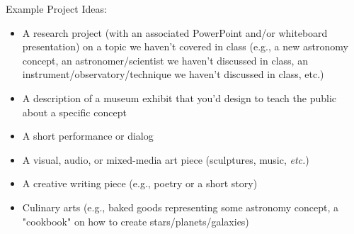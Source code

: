 \documentclass[11pt]{article}
\begin{document}
\bigskip \noindent
Example Project Ideas:
\begin{itemize}[noitemsep]
    \item A research project (with an associated PowerPoint and/or whiteboard presentation) on a topic we haven't covered in class (e.g., a new astronomy concept, an astronomer/scientist we haven’t discussed in class, an instrument/observatory/technique we haven’t discussed in class, etc.)
    \item A description of a museum exhibit that you'd design to teach the public about a specific concept
    \item A short performance or dialog
    \item A visual, audio, or mixed-media art piece (sculptures, music, \textit{etc.})
    \item A creative writing piece (e.g., poetry or a short story)
    \item Culinary arts (e.g., baked goods representing some astronomy concept, a "cookbook" on how to create stars/planets/galaxies)

\end{itemize}
\end{document}
